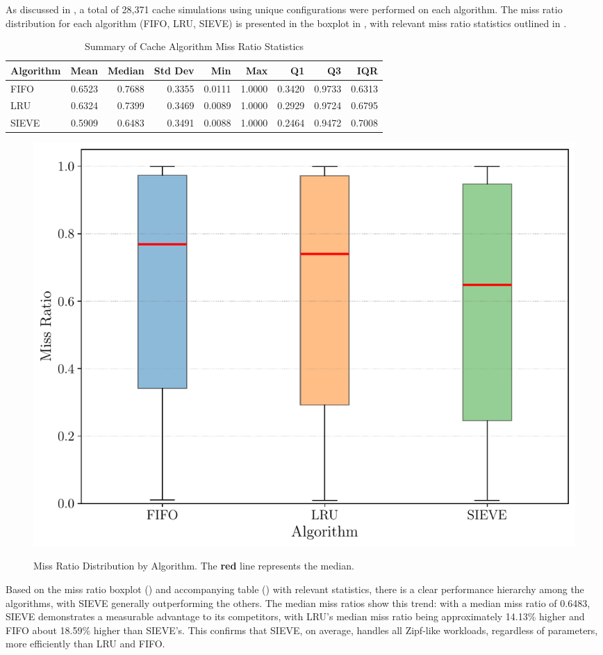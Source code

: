 
As discussed in , a total of 28,371 cache simulations using unique configurations were performed on each algorithm. The miss ratio distribution for each algorithm (FIFO, LRU, SIEVE) is presented in the boxplot in , with relevant miss ratio statistics outlined in .

\begin{table}[h!]
    \centering
    \caption{Summary of Cache Algorithm Miss Ratio Statistics}
    \label{tab: miss_ratio_stats}
    \begin{tabular}{l r r r r r r r r}
        \toprule
        \textbf{Algorithm} & \textbf{Mean} & \textbf{Median} & \textbf{Std Dev} & \textbf{Min} & \textbf{Max} & \textbf{Q1} & \textbf{Q3} & \textbf{IQR} \\
        \midrule
        FIFO & 0.6523 & 0.7688 & 0.3355 & 0.0111 & 1.0000 & 0.3420 & 0.9733 & 0.6313 \\
        LRU & 0.6324 & 0.7399 & 0.3469 & 0.0089 & 1.0000 & 0.2929 & 0.9724 & 0.6795 \\
        SIEVE & 0.5909 & 0.6483 & 0.3491 & 0.0088 & 1.0000 & 0.2464 & 0.9472 & 0.7008 \\
        \bottomrule
    \end{tabular}
\end{table}

\begin{figure}[h!]
    \centering
    \caption{Miss Ratio Distribution by Algorithm. The {\color{red}\textbf{red}} line represents the median.}
    \includegraphics[width=0.6\linewidth]{figures/simulations/miss_ratio_distribution_no_title.pdf}
    \label{fig:miss-ratio-distribution}
\end{figure}

Based on the miss ratio boxplot () and accompanying table () with relevant statistics, there is a clear performance hierarchy among the algorithms, with SIEVE generally outperforming the others. The median miss ratios show this trend: with a median miss ratio of 0.6483, SIEVE demonstrates a measurable advantage to its competitors, with LRU's median miss ratio being approximately 14.13\% higher and FIFO about 18.59\% higher than SIEVE's. This confirms that SIEVE, on average, handles all Zipf-like workloads, regardless of parameters, more efficiently than LRU and FIFO.


